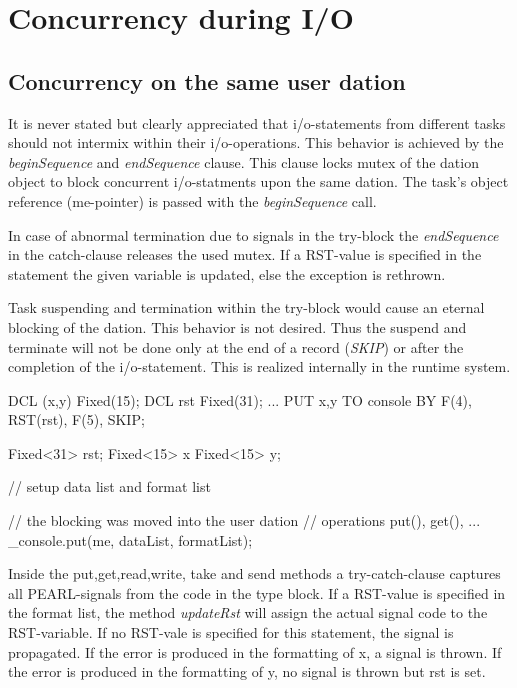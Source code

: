 \section{Concurrency during I/O}
\label{ioconcurrency}

\subsection{Concurrency on the same user dation}
It is never stated but clearly appreciated that i/o-statements from
different tasks should not intermix within their i/o-operations.
This behavior is achieved by the {\em beginSequence} and 
{\em endSequence} clause. 
This clause locks mutex of the dation object to block concurrent
i/o-statments upon the same dation.
The task's object reference (me-pointer) is passed with
the {\em beginSequence} call.

In case of abnormal termination due to signals in the try-block
the {\em endSequence} in the catch-clause releases the used mutex.
If a RST-value is specified in the statement the given variable is
updated, else the exception is rethrown.

Task suspending and termination within the try-block would cause an
eternal blocking of the dation. 
This behavior is not desired.
Thus the suspend and terminate will not be done only at the end of a record
({\em SKIP}) or after the completion of the i/o-statement.
This is realized internally in the runtime system.

\begin{PEARLCode}
DCL (x,y) Fixed(15);
DCL rst Fixed(31);
...
PUT x,y TO console BY F(4), RST(rst), F(5), SKIP;
\end{PEARLCode}

\begin{CppCode}
Fixed<31> rst;
Fixed<15> x
Fixed<15> y;

{
   // setup data list and format list

   // the blocking was moved into the user dation
   // operations put(), get(), ...
   _console.put(me, dataList, formatList);
}
\end{CppCode}

Inside the put,get,read,write, take and send methods a
try-catch-clause captures all PEARL-signals from the code in the 
type block. If a RST-value is specified in the format list, the method
{\em updateRst} will assign the actual signal code to the RST-variable.
If no RST-vale is specified for this statement, the signal is propagated.
If the error is produced in the formatting of x, a signal is thrown.
If the error is produced in the formatting of y, no signal is thrown but rst
is set.

